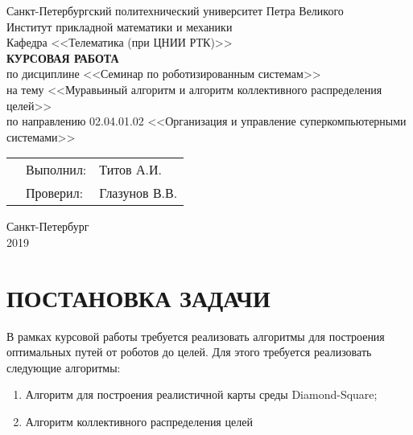 \documentclass{article}
\begin{document}
    \thispagestyle{empty}
	\begin{center}
		Санкт-Петербургский политехнический университет Петра Великого\\
		Институт прикладной математики и механики\\
		Кафедра <<Телематика (при ЦНИИ РТК)>>\\
		\vspace*{\fill}
		\textbf{\Large{КУРСОВАЯ РАБОТА}}\\
		\vspace{0.5cm}
        \large{по дисциплине <<Семинар по роботизированным системам>>\\}
        \large{на тему <<Муравьиный алгоритм и алгоритм коллективного распределения целей>>}\\
        \vspace{1cm}
        по направлению 02.04.01.02 <<Организация и управление суперкомпьютерными системами>>
	\end{center}
	\vspace{3cm}
	\begin{tabular} {l l l}
	\hspace{10cm} & Выполнил: & Титов А.И.\\
	& Проверил: & Глазунов В.В.
	\end{tabular}
	\vspace*{\fill}
	\begin{center}
		Санкт-Петербург\\
		2019
    \end{center}
    \newpage


	\renewcommand\contentsname{Оглавление}
	\tableofcontents

	\newpage
	\section*{ПОСТАНОВКА ЗАДАЧИ}

    В рамках курсовой работы требуется реализовать алгоритмы для построения оптимальных путей от роботов до целей. Для этого требуется реализовать следующие алгоритмы:

    \begin{enumerate}
        \item Алгоритм для построения реалистичной карты среды Diamond-Square;
        \item Алгоритм коллективного распределения целей
    \end{enumerate}
\end{document}
